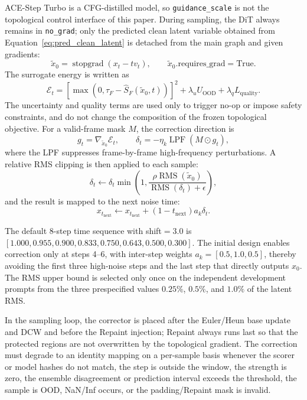 \documentclass{article}
\begin{document}
ACE-Step Turbo is a CFG-distilled model, so \texttt{guidance\_scale} is not the topological control interface of this paper. During sampling, the DiT always remains in \texttt{no\_grad}; only the predicted clean latent variable obtained from Equation~\eqref{eq:pred_clean_latent} is detached from the main graph and given gradients:
\begin{equation}
\tilde{x}_0=\operatorname{stopgrad}(x_t-tv_t),\qquad
\tilde{x}_0.\mathrm{requires\_grad}=\mathrm{True}.
\end{equation}
The surrogate energy is written as
\begin{equation}
\mathcal{E}_t=
\left[\max(0,\tau_F-\hat{S}_F(\tilde{x}_0,t))\right]^2
+\lambda_uU_{\mathrm{OOD}}+\lambda_qL_{\mathrm{quality}}.
\end{equation}
The uncertainty and quality terms are used only to trigger no-op or impose safety constraints, and do not change the composition of the frozen topological objective. For a valid-frame mask $M$, the correction direction is
\begin{equation}
g_t=\nabla_{\tilde{x}_0}\mathcal{E}_t,\qquad
\delta_t=-\eta_k\operatorname{LPF}(M\odot g_t),
\end{equation}
where the LPF suppresses frame-by-frame high-frequency perturbations. A relative RMS clipping is then applied to each sample:
\begin{equation}
\delta_t\leftarrow\delta_t\min\left(1,
\frac{\rho\operatorname{RMS}(\tilde{x}_0)}
{\operatorname{RMS}(\delta_t)+\epsilon}\right),
\end{equation}
and the result is mapped to the next noise time:
\begin{equation}
x_{t_{\mathrm{next}}}\leftarrow x_{t_{\mathrm{next}}}
+(1-t_{\mathrm{next}})a_k\delta_t.
\label{eq:topology_corrector_update}
\end{equation}

The default 8-step time sequence with shift$=3.0$ is
$[1.000,0.955,0.900,0.833,0.750,0.643,0.500,0.300]$. The initial design enables correction only at steps 4--6, with inter-step weights $a_k=[0.5,1.0,0.5]$, thereby avoiding the first three high-noise steps and the last step that directly outputs $x_0$. The RMS upper bound is selected only once on the independent development prompts from the three prespecified values $0.25\%$, $0.5\%$, and $1.0\%$ of the latent RMS.

In the sampling loop, the corrector is placed after the Euler/Heun base update and DCW and before the Repaint injection; Repaint always runs last so that the protected regions are not overwritten by the topological gradient. The correction must degrade to an identity mapping on a per-sample basis whenever the scorer or model hashes do not match, the step is outside the window, the strength is zero, the ensemble disagreement or prediction interval exceeds the threshold, the sample is OOD, NaN/Inf occurs, or the padding/Repaint mask is invalid.
\end{document}
